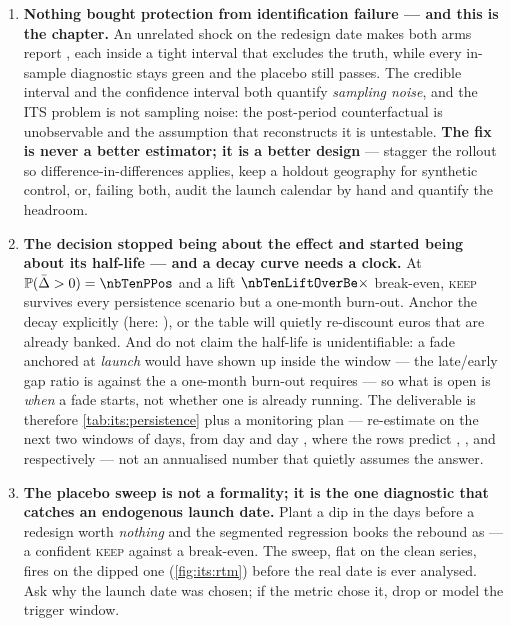 \begin{enumerate}[leftmargin=*, itemsep=.45em]
  \item \textbf{Nothing bought protection from identification failure --- and this is the chapter.}
        An unrelated \pp{+\nbTenShock} shock on the redesign date makes both arms report
        \pp{\nbTenShockSum}, each inside a tight interval that excludes the truth, while every
        in-sample diagnostic stays green and the placebo still passes. The credible interval and the
        confidence interval both quantify \emph{sampling noise}, and the ITS problem is not sampling
        noise: the post-period counterfactual is unobservable and the assumption that reconstructs
        it is untestable. \textbf{The fix is never a better estimator; it is a better design} ---
        stagger the rollout so difference-in-differences applies, keep a holdout
        geography for synthetic control, or, failing both, audit the launch calendar by hand and
        quantify
        the headroom.

  \item \textbf{The decision stopped being about the effect and started being about its
        half-life --- and a decay curve needs a clock.} At $\Prob(\bar\Delta > 0) = \nbTenPPos$ and
        a lift $\nbTenLiftOverBe\times$ break-even, \textsc{keep} survives every persistence
        scenario but a one-month burn-out. Anchor the decay explicitly (here: \nbTenDecayAnchor),
        or the table will quietly re-discount euros that are already banked. And do not claim the
        half-life is unidentifiable: a fade anchored at \emph{launch} would have shown up inside the
        window --- the late/early gap ratio is \nbTenDecayRatio{} against the
        \nbTenDecayImpliedOnem{} a one-month burn-out requires --- so what is open is \emph{when} a
        fade starts, not whether one is already running. The deliverable is therefore
        \cref{tab:its:persistence} plus a monitoring plan --- re-estimate on the next two windows of
        \nbTenNPost{} days, from day \nbTenMonitorFirst{} and day \nbTenMonitorSecond, where the
        rows predict \pp{\nbTenBayesAvg}, \pp{\nbTenMonitorGapSixm}, \pp{\nbTenMonitorGapThreem} and
        \pp{\nbTenMonitorGapOnem} respectively --- not an annualised number that quietly assumes the
        answer.

  \item \textbf{The placebo sweep is not a formality; it is the one diagnostic that catches an
        endogenous launch date.} Plant a \pp{\nbTenRtmDip} dip in the \nbTenRtmDipLen{} days before
        a redesign worth \emph{nothing} and the segmented regression books the rebound as
        \pp{\nbTenRtmEst} --- a confident \textsc{keep} against a \pp{\nbTenBeLift} break-even. The
        sweep, flat on the clean series, fires on the dipped one (\cref{fig:its:rtm}) before the
        real date is ever analysed. Ask why the launch date was chosen; if the metric chose it,
        drop or model the trigger window.
\end{enumerate}

